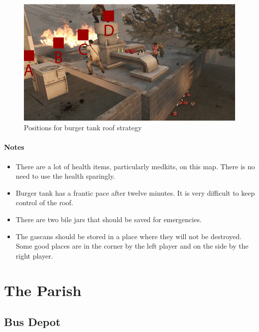 \begin{figure}[htb!]
\centering
\includegraphics[width=0.70\columnwidth]{bt/bt_positions}
\caption{Positions for burger tank roof strategy}
\label{fig:bt_positions}
\end{figure}

\paragraph{Notes}
\begin{itemize}
\item There are a lot of health items, particularly medkits, on this map. There is no need to use the health sparingly.
\item Burger tank has a frantic pace after twelve minutes. It is very difficult to keep control of the roof.
\item There are two bile jars that should be saved for emergencies.
\item The gascans should be stored in a place where they will not be destroyed. Some good places are in the corner by the left player and on the side by the right player.
\end{itemize}

\section{The Parish}

\subsection{Bus Depot}


